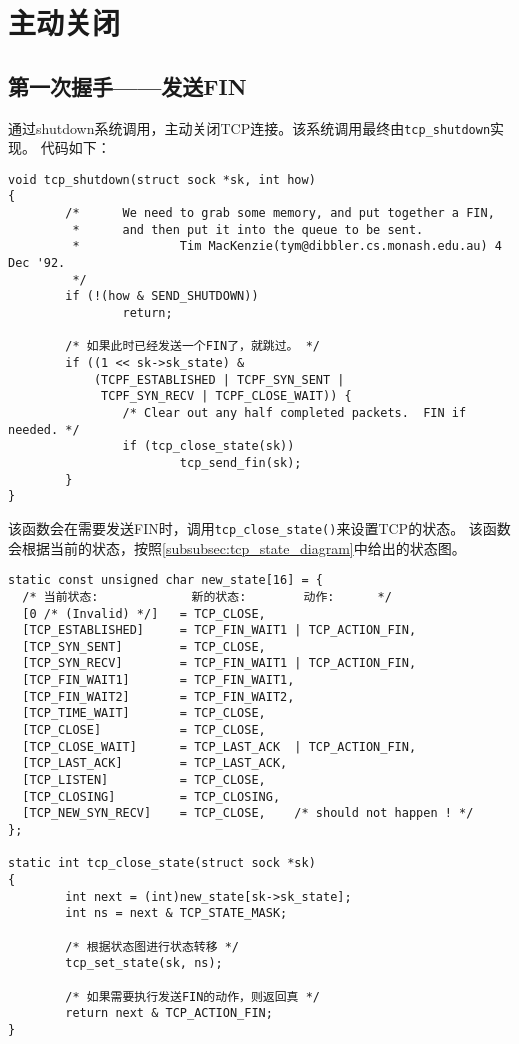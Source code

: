 \section{主动关闭}
\label{sec:tcp_active_close}

\subsection{第一次握手——发送FIN}
\label{subsec:tcp_shutdown}
通过shutdown系统调用，主动关闭TCP连接。该系统调用最终由\texttt{tcp_shutdown}实现。
代码如下：

\begin{verbatim}
void tcp_shutdown(struct sock *sk, int how)
{
        /*      We need to grab some memory, and put together a FIN,
         *      and then put it into the queue to be sent.
         *              Tim MacKenzie(tym@dibbler.cs.monash.edu.au) 4 Dec '92.
         */
        if (!(how & SEND_SHUTDOWN))
                return;

        /* 如果此时已经发送一个FIN了，就跳过。 */
        if ((1 << sk->sk_state) &
            (TCPF_ESTABLISHED | TCPF_SYN_SENT |
             TCPF_SYN_RECV | TCPF_CLOSE_WAIT)) {
                /* Clear out any half completed packets.  FIN if needed. */
                if (tcp_close_state(sk))
                        tcp_send_fin(sk);
        }
}
\end{verbatim}
该函数会在需要发送FIN时，调用\texttt{tcp_close_state()}来设置TCP的状态。
该函数会根据当前的状态，按照\ref{subsubsec:tcp_state_diagram}中给出的状态图。
\begin{verbatim}
static const unsigned char new_state[16] = {
  /* 当前状态:             新的状态:        动作:      */
  [0 /* (Invalid) */]   = TCP_CLOSE,
  [TCP_ESTABLISHED]     = TCP_FIN_WAIT1 | TCP_ACTION_FIN,
  [TCP_SYN_SENT]        = TCP_CLOSE,
  [TCP_SYN_RECV]        = TCP_FIN_WAIT1 | TCP_ACTION_FIN,
  [TCP_FIN_WAIT1]       = TCP_FIN_WAIT1,
  [TCP_FIN_WAIT2]       = TCP_FIN_WAIT2,
  [TCP_TIME_WAIT]       = TCP_CLOSE,
  [TCP_CLOSE]           = TCP_CLOSE,
  [TCP_CLOSE_WAIT]      = TCP_LAST_ACK  | TCP_ACTION_FIN,
  [TCP_LAST_ACK]        = TCP_LAST_ACK,
  [TCP_LISTEN]          = TCP_CLOSE,
  [TCP_CLOSING]         = TCP_CLOSING,
  [TCP_NEW_SYN_RECV]    = TCP_CLOSE,    /* should not happen ! */
};

static int tcp_close_state(struct sock *sk)
{
        int next = (int)new_state[sk->sk_state];
        int ns = next & TCP_STATE_MASK;

        /* 根据状态图进行状态转移 */
        tcp_set_state(sk, ns);

        /* 如果需要执行发送FIN的动作，则返回真 */
        return next & TCP_ACTION_FIN;
}
\end{verbatim}

